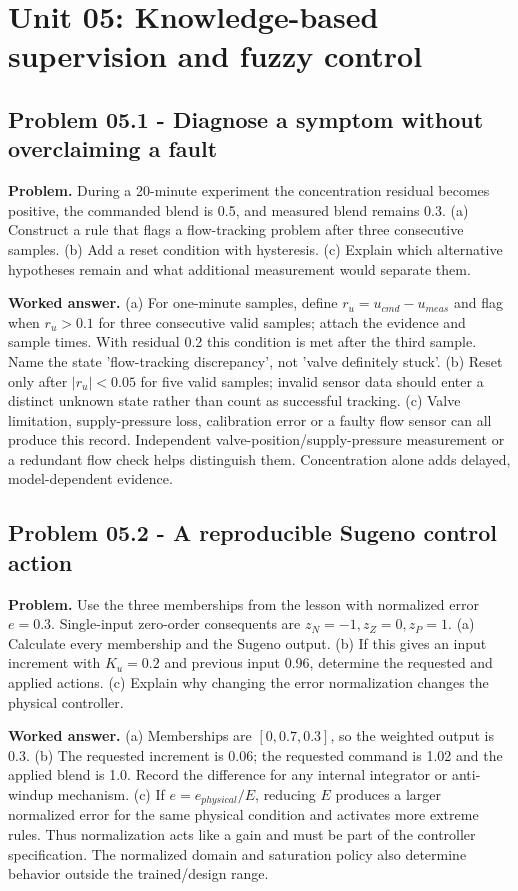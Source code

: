 \documentclass[11pt,a4paper]{article}
\begin{document}
\clearpage\section{Unit 05: Knowledge-based supervision and fuzzy control}
\subsection{Problem 05.1 - Diagnose a symptom without overclaiming a fault}
\textbf{Problem.} During a 20-minute experiment the concentration residual becomes positive, the commanded blend is 0.5, and measured blend remains 0.3. (a) Construct a rule that flags a flow-tracking problem after three consecutive samples. (b) Add a reset condition with hysteresis. (c) Explain which alternative hypotheses remain and what additional measurement would separate them.


\textbf{Worked answer.} (a) For one-minute samples, define $r_u=u_{cmd}-u_{meas}$ and flag when $r_u>0.1$ for three consecutive valid samples; attach the evidence and sample times. With residual 0.2 this condition is met after the third sample. Name the state 'flow-tracking discrepancy', not 'valve definitely stuck'. (b) Reset only after $|r_u|<0.05$ for five valid samples; invalid sensor data should enter a distinct unknown state rather than count as successful tracking. (c) Valve limitation, supply-pressure loss, calibration error or a faulty flow sensor can all produce this record. Independent valve-position/supply-pressure measurement or a redundant flow check helps distinguish them. Concentration alone adds delayed, model-dependent evidence.

\subsection{Problem 05.2 - A reproducible Sugeno control action}
\textbf{Problem.} Use the three memberships from the lesson with normalized error $e=0.3$. Single-input zero-order consequents are $z_N=-1,z_Z=0,z_P=1$. (a) Calculate every membership and the Sugeno output. (b) If this gives an input increment with $K_u=0.2$ and previous input 0.96, determine the requested and applied actions. (c) Explain why changing the error normalization changes the physical controller.


\textbf{Worked answer.} (a) Memberships are $[0,0.7,0.3]$, so the weighted output is 0.3. (b) The requested increment is 0.06; the requested command is 1.02 and the applied blend is 1.0. Record the difference for any internal integrator or anti-windup mechanism. (c) If $e=e_{physical}/E$, reducing $E$ produces a larger normalized error for the same physical condition and activates more extreme rules. Thus normalization acts like a gain and must be part of the controller specification. The normalized domain and saturation policy also determine behavior outside the trained/design range.
\end{document}
